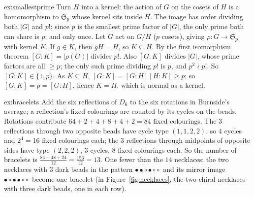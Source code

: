 \begin{solution}{ex:smallestprime}
\idea Turn $H$ into a kernel: the action of $G$ on the cosets of $H$ is a homomorphism to $\mathfrak S_p$ whose kernel sits inside $H$. The image has order dividing both $|G|$ and $p!$; since $p$ is the smallest prime factor of $|G|$, the only prime both can share is $p$, and only once.
\writeup Let $G$ act on $G/H$ ($p$ cosets), giving $\rho:G\to\mathfrak S_p$ with kernel $K$. If $g\in K$, then $gH=H$, so $K\subseteq H$. By the first isomorphism theorem $[G:K]=|\rho(G)|$ divides $p!$. Also $[G:K]$ divides $|G|$, whose prime factors are all $\ge p$; the only such prime dividing $p!$ is $p$, and $p^2\nmid p!$. So $[G:K]\in\{1,p\}$. As $K\subseteq H$, $[G:K]=[G:H][H:K]\ge p$; so $[G:K]=p=[G:H]$, hence $K=H$, which is normal as a kernel.
\end{solution}

\begin{solution}{ex:bracelets}
\idea Add the six reflections of $D_6$ to the six rotations in Burnside's average; a reflection's fixed colourings are counted by its cycles on the beads.
\writeup Rotations contribute $64+2+4+8+4+2=84$ fixed colourings. The $3$ reflections through two opposite beads have cycle type $(1,1,2,2)$, so $4$ cycles and $2^4=16$ fixed colourings each; the $3$ reflections through midpoints of opposite sides have type $(2,2,2)$, $3$ cycles, $8$ fixed colourings each. So the number of bracelets is $\frac{84+48+24}{12}=\frac{156}{12}=13$. One fewer than the $14$ necklaces: the two necklaces with $3$ dark beads in the pattern $\bullet\bullet\circ\bullet\circ\circ$ and its mirror image $\bullet\circ\bullet\bullet\circ\circ$ become one bracelet (in Figure~\ref{fig:necklaces}, the two chiral necklaces with three dark beads, one in each row).
\end{solution}

